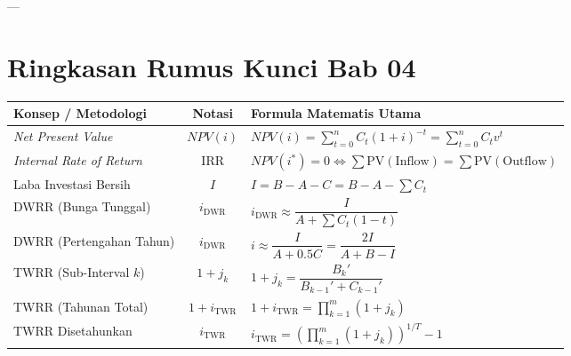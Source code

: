 \documentclass[11pt,a4paper]{article}
\begin{document}
---

\section{Ringkasan Rumus Kunci Bab 04}

\begin{center}
\small
\renewcommand{\arraystretch}{1.45}
\begin{tabular}{p{4.2cm}cp{7.6cm}}
\toprule
\textbf{Konsep / Metodologi} & \textbf{Notasi} & \textbf{Formula Matematis Utama} \\
\midrule
\textit{Net Present Value} & $NPV(i)$ & $NPV(i) = \sum_{t=0}^n C_t (1+i)^{-t} = \sum_{t=0}^n C_t v^t$ \\
\textit{Internal Rate of Return} & IRR & $NPV(i^*) = 0 \iff \sum \text{PV}(\text{Inflow}) = \sum \text{PV}(\text{Outflow})$ \\
Laba Investasi Bersih & $I$ & $I = B - A - C = B - A - \sum C_t$ \\
DWRR (Bunga Tunggal) & $i_{\text{DWR}}$ & $i_{\text{DWR}} \approx \dfrac{I}{A + \sum C_t (1 - t)}$ \\
DWRR (Pertengahan Tahun) & $i_{\text{DWR}}$ & $i \approx \dfrac{I}{A + 0.5 C} = \dfrac{2I}{A + B - I}$ \\
TWRR (Sub-Interval $k$) & $1 + j_k$ & $1 + j_k = \dfrac{B_k'}{B_{k-1}' + C_{k-1}'}$ \\
TWRR (Tahunan Total) & $1 + i_{\text{TWR}}$ & $1 + i_{\text{TWR}} = \prod_{k=1}^m (1 + j_k)$ \\
TWRR Disetahunkan & $i_{\text{TWR}}$ & $i_{\text{TWR}} = \left( \prod_{k=1}^m (1 + j_k) \right)^{1/T} - 1$ \\
\bottomrule
\end{tabular}
\end{center}
\end{document}
